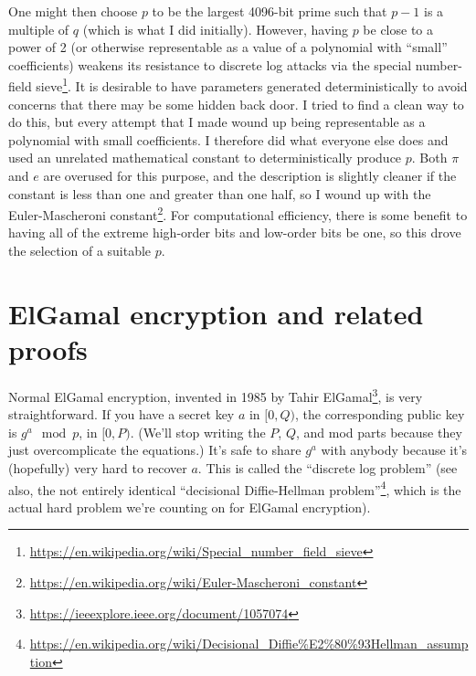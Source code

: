 One might then choose $p$ to be the largest 4096-bit prime such that
$p-1$ is a multiple of $q$ (which is what I did initially).  However,
having $p$ be close to a power of 2 (or otherwise representable as a
value of a polynomial with ``small'' coefficients) weakens its
resistance to discrete log attacks via the special number-field
sieve\footnote{\url{https://en.wikipedia.org/wiki/Special_number_field_sieve}}.
It is desirable to have parameters generated deterministically to
avoid concerns that there may be some hidden back door.  I tried to
find a clean way to do this, but every attempt that I made wound up
being representable as a polynomial with small coefficients.  I
therefore did what everyone else does and used an unrelated
mathematical constant to deterministically produce $p$.  Both $\pi$
and $e$ are overused for this purpose, and the description is slightly cleaner
if the constant is less than one and greater than one half, so I wound
up with the Euler-Mascheroni
constant\footnote{\url{https://en.wikipedia.org/wiki/Euler-Mascheroni_constant}}.
For computational efficiency,
there is some benefit to having all of the extreme high-order bits and
low-order bits be one, so this drove the selection of a suitable $p$.


\section{ElGamal encryption and related proofs}
Normal ElGamal encryption, invented in 1985 by Tahir
ElGamal\footnote{\url{https://ieeexplore.ieee.org/document/1057074}}, is very straightforward. If
you have a secret key $a$ in $[0,Q)$, the corresponding public key is
$g^a \mod p$, in $[0,P)$. (We'll stop writing the $P$, $Q$, and mod
parts because they just overcomplicate the equations.) It's safe to
share $g^a$ with anybody because it's (hopefully) very hard to recover
$a$. This is called the ``discrete log problem'' (see also, the
not entirely identical ``decisional Diffie-Hellman
problem''\footnote{\url{https://en.wikipedia.org/wiki/Decisional_Diffie\%E2\%80\%93Hellman_assumption}},
which is the actual hard problem we're counting on for ElGamal
encryption).

